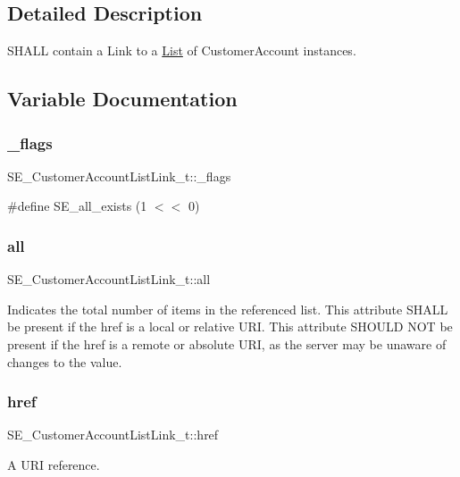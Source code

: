 \subsection{Detailed Description}
S\+H\+A\+LL contain a Link to a \hyperlink{structList}{List} of Customer\+Account instances. 

\subsection{Variable Documentation}
\mbox{\label{group__CustomerAccountListLink_ga01fd3aae6915060506e74a3ef840eaaf}} 
\subsubsection{\texorpdfstring{\+\_\+flags}{\_flags}}
{\footnotesize\ttfamily S\+E\+\_\+\+Customer\+Account\+List\+Link\+\_\+t\+::\+\_\+flags}

\#define S\+E\+\_\+all\+\_\+exists (1 $<$$<$ 0) \mbox{\label{group__CustomerAccountListLink_ga3c03b4479a40a58a6184085922237ae1}} 
\subsubsection{\texorpdfstring{all}{all}}
{\footnotesize\ttfamily S\+E\+\_\+\+Customer\+Account\+List\+Link\+\_\+t\+::all}

Indicates the total number of items in the referenced list. This attribute S\+H\+A\+LL be present if the href is a local or relative U\+RI. This attribute S\+H\+O\+U\+LD N\+OT be present if the href is a remote or absolute U\+RI, as the server may be unaware of changes to the value. \mbox{\label{group__CustomerAccountListLink_ga42b5e2091d750acc99f8b6d3d8b57283}} 
\subsubsection{\texorpdfstring{href}{href}}
{\footnotesize\ttfamily S\+E\+\_\+\+Customer\+Account\+List\+Link\+\_\+t\+::href}

A U\+RI reference. 